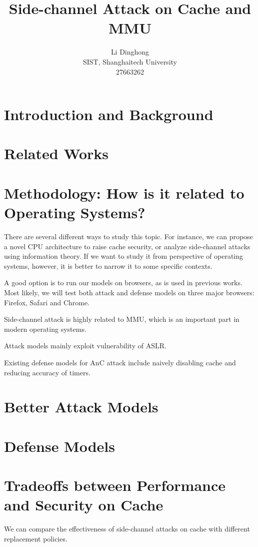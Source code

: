 \documentclass{article}
\title{Side-channel Attack on Cache and MMU}
\author{Li Dinghong \\SIST, Shanghaitech University \\27663262}
\begin{document}
\maketitle
\large

\section{Introduction and Background}{}

\section{Related Works}{}

\section{Methodology: How is it related to Operating Systems? }{
	There are several different ways to study this topic. For instance, we can propose a novel CPU architecture to raise cache security, or analyze side-channel attacks using information theory. If we want to study it from perspective of operating systems, however, it is better to narrow it to some specific contexts. 

	A good option is to run our models on browsers, as is used in previous works. Most likely, we will test both attack and defense models on three major browsers: Firefox, Safari and Chrome. 

	Side-channel attack is highly related to MMU, which is an important part in modern operating systems. 

	Attack models mainly exploit vulnerability of ASLR. 

	Existing defense models for AnC attack include naively disabling cache and reducing accuracy of timers. 
}

\section{Better Attack Models}{}

\section{Defense Models}{}

\section{Tradeoffs between Performance and Security on Cache}{
	We can compare the effectiveness of side-channel attacks on cache with different replacement policies. 
}
\end{document}
